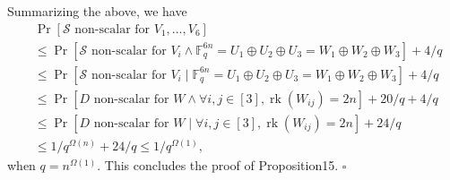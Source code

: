 \documentclass[10pt,a4paper]{article}
\begin{document}
Summarizing the above, we have
\begin{align*}
&\Pr[\mathcal S\text{ non-scalar for }V_1,\ldots,V_6]\\
&\le\Pr[\mathcal S\text{ non-scalar for }V_i\wedge\mathbb F_q^{6n}=U_1\oplus U_2\oplus U_3=W_1\oplus W_2\oplus W_3]+4/q\\
&\le\Pr[\mathcal S\text{ non-scalar for }V_i\mid\mathbb F_q^{6n}=U_1\oplus U_2\oplus U_3=W_1\oplus W_2\oplus W_3]+4/q\\
&\le\Pr[D\text{ non-scalar for }W\wedge\forall i,j\in[3],\operatorname{rk}(W_{ij})=2n]+20/q+4/q\\
&\le\Pr[D\text{ non-scalar for }W\mid\forall i,j\in[3],\operatorname{rk}(W_{ij})=2n]+24/q\\
&\le1/q^{\Omega(n)}+24/q\le1/q^{\Omega(1)},
\end{align*}
when $q=n^{\Omega(1)}$. This concludes the proof of Proposition15. \hfill$\square$
\end{document}
